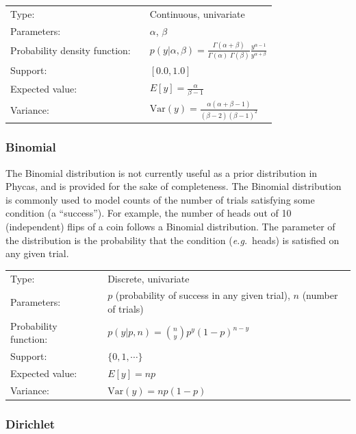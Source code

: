 \documentclass[10pt]{article}
\newcommand{\eg}{{\em e.g.}~}
\newcommand{\Var}{\mbox{Var}}
\newcommand{\phycas}{{\sc Phycas}\index{Phycas}}
\begin{document}
\begin{tabular}{lcl}
Type:                 & & Continuous, univariate \\
Parameters:           & & $\alpha$, $\beta$   \\
Probability density function: & & $p(y|\alpha, \beta) = \frac{\Gamma(\alpha + \beta)}{\Gamma(\alpha) \; \Gamma(\beta)} \frac{y^{\alpha-1}}{y^{\alpha + \beta}}$ \\
Support:              & & $[0.0,1.0]$     \\
Expected value:       & & $E[y] = \frac{\alpha}{\beta - 1}$ \\
Variance:             & & $\Var(y) = \frac{\alpha (\alpha + \beta - 1)}{(\beta - 2)(\beta - 1)^2}$
\end{tabular}

\subsubsection{Binomial}

The Binomial distribution is not currently useful as a prior distribution in \phycas, and is provided for the sake of completeness. The Binomial distribution is commonly used to model counts of the number of trials satisfying some condition (a ``success''). For example, the number of heads out of 10 (independent) flips of a coin follows a Binomial distribution. The parameter of the distribution is the probability that the condition (\eg heads) is satisfied on any given trial.

\begin{tabular}{lcl}
Type:                 & & Discrete, univariate \\
Parameters:           & & $p$ (probability of success in any given trial), $n$ (number of trials)    \\
Probability function: & & $p(y|p,n) = {n \choose y} p^y (1-p)^{n-y} $ \\
Support:              & & $\{0,1,\cdots\}$     \\
Expected value:       & & $E[y] = n p$ \\
Variance:             & & $\Var(y) = n p(1-p)$ 
\end{tabular}

\subsubsection{Dirichlet}
\end{document}

